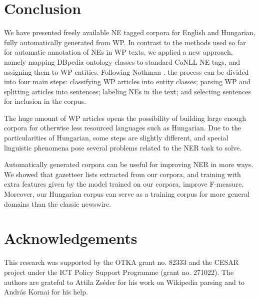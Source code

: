 \documentclass[11pt]{article}
\begin{document}
\section{Conclusion}
\label{sec:conclusion}

We have presented freely available NE tagged corpora for English and
Hungarian, fully automatically generated from WP. In contrast to the methods
used so far for automatic annotation of NEs in WP texts, we applied a new
approach, namely mapping DBpedia ontology classes to standard CoNLL NE tags,
and assigning them to WP entities. 
Following Nothman ,
the process can be divided into four main steps: classifying WP articles into
entity classes; parsing WP and splitting articles into sentences; labeling NEs
in the text; and selecting sentences for inclusion in the corpus.

The huge amount of WP articles opens the possibility of building large enough
corpora for otherwise less resourced languages such as Hungarian. Due to the
particularities of Hungarian, some steps are slightly different, and special
linguistic phenomena pose several problems related to the NER task to solve.

Automatically generated corpora can be useful for improving NER in more
ways. We showed that gazetteer lists extracted from our corpora, and training
with extra features given by the model trained on our corpora, improve
F-measure. Moreover, our Hungarian corpus can serve as a training corpus for
more general domains than the classic newswire.



\section*{Acknowledgements}

This research was supported by the OTKA grant no. 82333 and the CESAR project under the ICT Policy Support Programme (grant no. 271022). The authors are grateful to Attila Zséder for his work on Wikipedia parsing and to András Kornai for his help.
\end{document}
